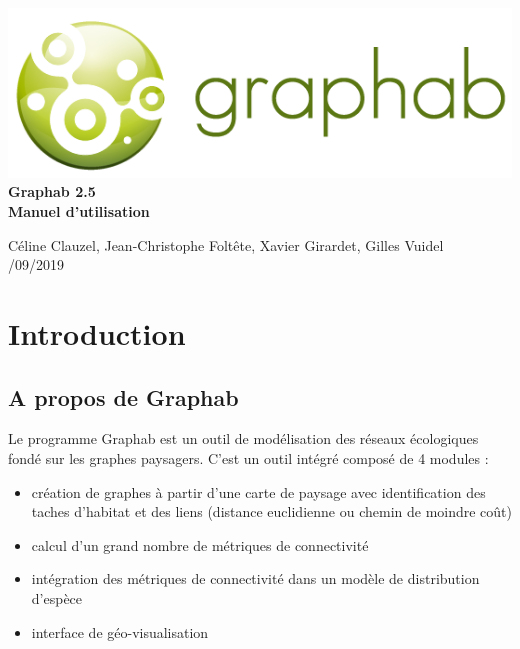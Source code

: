 \documentclass{article}
\begin{document}
 \begin{titlepage}
	
	\centering
	\includegraphics[scale=0.5]{img/logo.png}\\
	
	\bigskip
	\bigskip
	\bigskip	
	{\Huge
		\bfseries
		Graphab 2.5\\
		\bigskip
		Manuel d’utilisation\\
	}
	\bigskip
	\bigskip
	\bigskip
	\bigskip
	\bigskip
	
	{\Large		
		Céline Clauzel, Jean-Christophe Foltête, Xavier Girardet, Gilles Vuidel\\
		/09/2019\\
	}
	
\end{titlepage}

\setcounter{tocdepth}{2}
\tableofcontents

\pagebreak

\section{Introduction}

\subsection{A propos de Graphab}

Le programme Graphab est un outil de modélisation des réseaux écologiques fondé sur les graphes paysagers. C'est un outil intégré composé de 4 modules : 
\begin{itemize}
	\item création de graphes à partir d'une carte de paysage avec identification des taches d'habitat et des liens (distance euclidienne ou chemin de moindre coût)
	\item calcul d'un grand nombre de métriques de connectivité
	\item intégration des métriques de connectivité dans un modèle de distribution d’espèce
	\item interface de géo-visualisation
\end{itemize}
\end{document}
